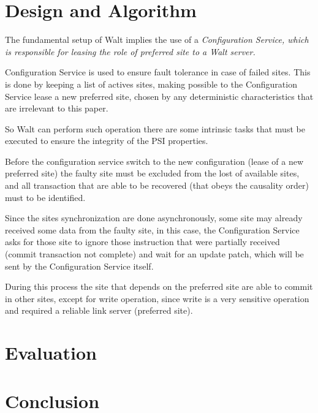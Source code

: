 \documentclass[a4paper]{article}
\begin{document}

\section{Design and Algorithm}

The fundamental setup of Walt implies the use of a \it{Configuration Service}, which is responsible for leasing the role of preferred site to a Walt server. 

Configuration Service is used to ensure fault tolerance in case of failed sites. This is done by keeping a list of actives sites, making possible to the Configuration Service lease a new preferred site, chosen by any deterministic characteristics that are irrelevant to this paper. 

So Walt can perform such operation there are some intrinsic tasks that must be executed to ensure the integrity of the PSI properties.

Before the configuration service switch to the new configuration (lease of a new preferred site) the faulty site must be excluded from the lost of available sites, and all transaction that are able to be recovered (that obeys the causality order) must to be identified.

Since the sites synchronization are done asynchronously, some site may already received some data from the faulty site, in this case, the Configuration Service asks for those site to ignore those instruction that were partially received (commit transaction not complete) and wait for an update patch, which will be sent by the Configuration Service itself.

During this process the site that depends on the preferred site are able to commit in other sites, except for write operation, since write is a very sensitive operation and required a reliable link server (preferred site).

\section{Evaluation}


\section{Conclusion}
\end{document}
